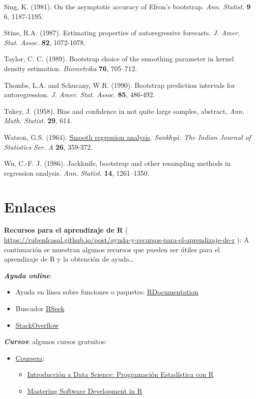 \documentclass[]{book}
\theoremstyle{definition}
\theoremstyle{definition}
\theoremstyle{definition}
\theoremstyle{remark}
\begin{document}
Sing, K. (1981). On the asymptotic accuracy of Efron's bootstrap.
\emph{Ann. Statist.} \textbf{9} 6, 1187-1195.

Stine, R.A. (1987). Estimating properties of autoregressive forecasts.
\emph{J. Amer. Stat. Assoc.} \textbf{82}, 1072-1078.

Taylor, C. C. (1989). Bootstrap choice of the smoothing parameter in
kernel density estimation. \emph{Biometrika} \textbf{76}, 705--712.

Thombs, L.A. and Schucany, W.R. (1990). Bootstrap prediction intervals
for autoregression. \emph{J. Amer. Stat. Assoc.} \textbf{85}, 486-492.

Tukey, J. (1958). Bias and confidence in not quite large samples,
abstract, \emph{Ann. Math. Statist.} \textbf{29}, 614.

Watson, G.S. (1964).
\href{https://www.jstor.org/stable/25049340?seq=1\#page_scan_tab_contents}{Smooth
regression analysis}. \emph{Sankhy{ā}: The Indian Journal of Statistics
Ser. A} \textbf{26}, 359-372.

Wu, C.-F. J. (1986). Jackknife, bootstrap and other resampling methods
in regression analysis. \emph{Ann. Statist.} \textbf{14}, 1261--1350.

\appendix


\chapter{Enlaces}\label{links}

\textbf{Recursos para el aprendizaje de R} (
\url{https://rubenfcasal.github.io/post/ayuda-y-recursos-para-el-aprendizaje-de-r}
): A continuación se muestran algunos recursos que pueden ser útiles
para el aprendizaje de R y la obtención de ayuda\ldots{}

\textbf{\emph{Ayuda online}}:

\begin{itemize}
\item
  Ayuda en línea sobre funciones o paquetes:
  \href{https://www.rdocumentation.org/}{RDocumentation}
\item
  Buscador \href{http://rseek.org/}{RSeek}
\item
  \href{http://stackoverflow.com/questions/tagged/r}{StackOverflow}
\end{itemize}

\textbf{\emph{Cursos}}: algunos cursos gratuitos:

\begin{itemize}
\item
  \href{https://www.coursera.org/}{Coursera}:

  \begin{itemize}
  \item
    \href{https://www.coursera.org/learn/intro-data-science-programacion-estadistica-r}{Introducción
    a Data Science: Programación Estadística con R}
  \item
    \href{https://www.coursera.org/specializations/r}{Mastering Software
    Development in R}
  \end{itemize}
\end{itemize}
\end{document}
